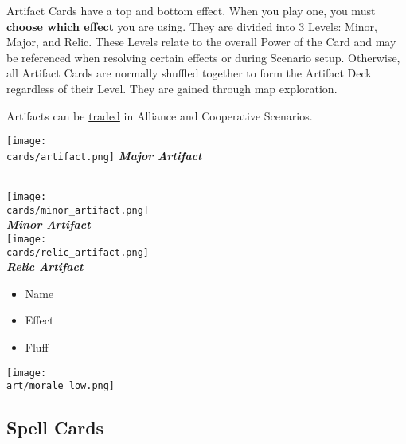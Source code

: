 \begin{multicols*}{2}
Artifact Cards have a top and bottom effect. When you play one, you must \textbf{choose which effect} you are using.
They are divided into 3 Levels: Minor, Major, and Relic.
These Levels relate to the overall Power of the Card and may be referenced when resolving certain effects or during Scenario setup.
Otherwise, all Artifact Cards are normally shuffled together to form the Artifact Deck regardless of their Level.
They are gained through map exploration.\par
Artifacts can be \hyperlink{Trading}{traded} in Alliance and Cooperative Scenarios.\par
\begin{multicols*}{2}
  \texttt{[image: \\cards/artifact.png]}
  \footnotesize
    \null\hfill\textbf{\textit{\textcolor{darkcandyapplered}{Major Artifact}}}
  \columnbreak
  \begin{center}
    \phantom{\ldots}\\
    \phantom{\ldots}\texttt{[image: \\cards/minor\_artifact.png]}\\
    \phantom{\ldots}\textbf{\textit{\textcolor{darkcandyapplered}{Minor Artifact}}}\\
    \vspace{3em}
    \phantom{\ldots}\texttt{[image: \\cards/relic\_artifact.png]}\\
    \phantom{\ldots}\textbf{\textit{\textcolor{darkcandyapplered}{Relic Artifact}}}
  \end{center}
\end{multicols*}
\begin{multicols}{2}
  \footnotesize
  \begin{itemize}
    \item[\textbf{1.}] Name
    \item[\textbf{2.}] Effect
    \columnbreak
    \item[\textbf{3.}] Fluff
  \end{itemize}
\end{multicols}

\vspace*{\fill}
\texttt{[image: \\art/morale\_low.png]}

\filbreak

\subsection*{\hypertarget{spells}{Spell Cards}}


\end{multicols*}
